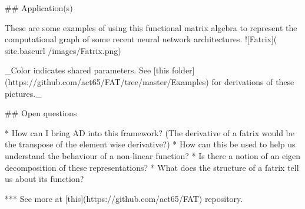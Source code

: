 ## Application(s)

These are some examples of using this functional matrix algebra to represent the computational graph of some recent neural network architectures.
![Fatrix]({{ site.baseurl }}/images/Fatrix.png)

_Color indicates shared parameters. See [this folder](https://github.com/act65/FAT/tree/master/Examples) for derivations of these pictures._

## Open questions

* How can I bring AD into this framework? (The derivative of a fatrix would be the transpose of the element wise derivative?)
* How can this be used to help us understand the behaviour of a non-linear function?
* Is there a notion of an eigen decomposition of these representations?
* What does the structure of a fatrix tell us about its function?

***
See more at [this](https://github.com/act65/FAT) repository.
